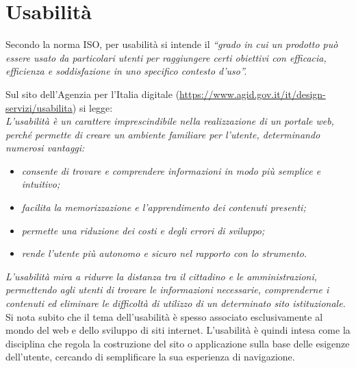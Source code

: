 \section{Usabilità}

Secondo la norma ISO, per usabilità si intende il \textit{``grado in cui un prodotto può essere usato da particolari utenti per raggiungere certi obiettivi con efficacia, efficienza e soddisfazione in uno specifico contesto d’uso''.} 

Sul sito dell'Agenzia per l'Italia digitale (\url{https://www.agid.gov.it/it/design-servizi/usabilita}) si legge: \\

\textit{L'usabilità è un carattere imprescindibile nella realizzazione di un portale web, perché permette di creare un ambiente familiare per l'utente, determinando numerosi vantaggi:}

\begin{itemize}
    \item \textit{consente di trovare e comprendere informazioni in modo più semplice e intuitivo;}
    \item \textit{facilita la memorizzazione e l'apprendimento dei contenuti presenti;}
    \item \textit{permette una riduzione dei costi e degli errori di sviluppo;}
    \item \textit{rende l'utente più autonomo e sicuro nel rapporto con lo strumento.}
\end{itemize}

\textit{L'usabilità mira a ridurre la distanza tra il cittadino e le amministrazioni, permettendo agli utenti di trovare le informazioni necessarie, comprenderne i contenuti ed eliminare le difficoltà di utilizzo di un determinato sito istituzionale.}\\

Si nota subito che il tema dell'usabilità è spesso associato esclusivamente al mondo del web e dello sviluppo di siti internet. L'usabilità è quindi intesa come la disciplina che regola la costruzione del sito o applicazione sulla base delle esigenze dell’utente, cercando di semplificare la sua esperienza di navigazione.

